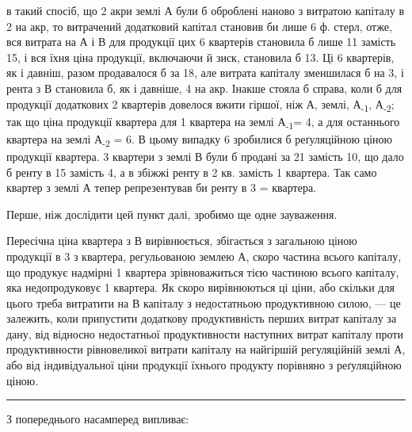 \parcont{}  %
в такий спосіб, що 2 акри землі А були б оброблені наново з витратою капіталу
в 2 на акр, то витрачений додатковий капітал становив би
лише 6 ф. стерл, отже, вся витрата на А і В для продукції цих 6 квартерів
становила б лише 11 замість 15, і вся їхня ціна
продукції, включаючи й зиск, становила б 13. Ці 6 квартерів, як
і давніш, разом продавалося б за 18, але витрата капіталу зменшилася
б на 3, і рента з В становила б, як і давніше, 4
на акр. Інакше стояла б справа, коли б для продукції додаткових 2 квартерів
довелося вжити гіршої, ніж А, землі, А\textsubscript{-1}, А\textsubscript{-2}; так що ціна продукції
квартера для 1 квартера на землі А\textsubscript{-1}= 4, а для останнього
квартера на землі А\textsubscript{-2} = 6. В цьому випадку 6
зробилися б реґуляційною ціною продукції квартера. 3 квартери з землі В
були б продані за 21 замість 10, що дало б ренту в 15 замість 4, а в збіжжі ренту в 2 кв. замість 1 квартера.
Так само квартер з землі А тепер репрезентував би ренту в 3 =
 квартера.

Перше, ніж дослідити цей пункт далі, зробимо ще одне зауваження.

Пересічна ціна квартера з В вирівнюється, збігається з загальною ціною
продукції в 3 з квартера, регульованою землею А, скоро частина
всього капіталу, що продукує надмірні 1 квартера зрівноважиться тією частиною
всього капіталу, яка недопродуковує 1 квартера. Як скоро вирівнюються
ці ціни, або скільки для цього треба витратити на В капіталу з недостатньою
продуктивною силою, — це залежить, коли припустити додаткову
продуктивність перших витрат капіталу за дану, від відносно недостатньої продуктивности
наступних витрат капіталу проти продуктивности рівновеликої витрати
капіталу на найгіршій регуляційній землі А, або від індивідуальної ціни
продукції їхнього продукту порівняно з реґуляційною ціною.

\pfbreak

З попереднього насамперед випливає:


